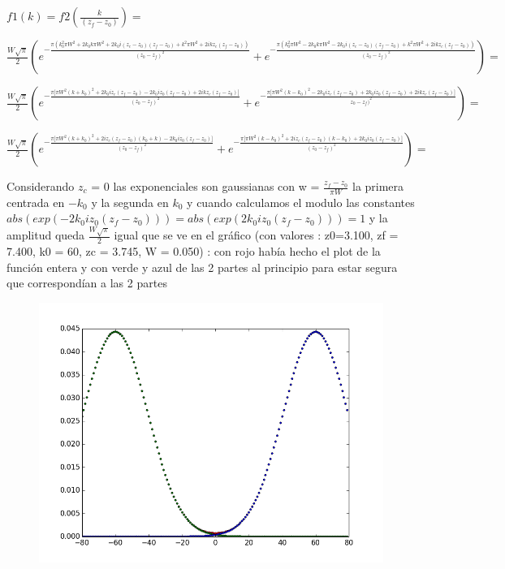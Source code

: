 \documentclass{article}
\begin{document}
$f1(k) = f2(\frac{k}{(z_f - z_0)}) = $

$ \frac{W \sqrt{\pi}}{2}  (e^{-\frac{\pi (k_0^2 \pi  W^2 + 2 k_0 k \pi W^2 + 2 k_0 i  (z_c - z_0) (z_f-z_0)+k^2 \pi W^2 +
2 i k z_c (z_f - z_0))}{(z_0-z_f)^2}}+e^{-\frac{\pi  (k_0^2 \pi  W^2 - 2 k_0 k \pi  W^2 - 2 k_0 i (z_c - z_0) (z_f-z_0)+k^2 \pi  W^2+2 i k z_c (z_f - z_0))}{(z_0-z_f)^2}}) =
$

$ \frac{W \sqrt{\pi}}{2}  (e^{-\frac{\pi \big[ \pi  W^2 (k + k_0)^2   + 2 k_0 i z_c(z_f - z_0)   - 2 k_0 i z_0 (z_f-z_0) +
2 i k z_c (z_f - z_0)\big]}{(z_0-z_f)^2}}+e^{-\frac{\pi \big[\pi  W^2 (k - k_0)^2  -2 k_0 i z_c(z_f - z_0)  + 2 k_0 i z_0 (z_f-z_0)+2 i k z_c (z_f - z_0)\big]}{z_0-z_f)^2}}) =
$

$ \frac{W \sqrt{\pi}}{2}  (e^{-\frac{\pi \big[ \pi  W^2 (k + k_0)^2   + 2  i z_c(z_f - z_0)(k_0 + k)   - 2 k_0 i z_0 (z_f-z_0) \big]}{(z_0-z_f)^2}}+e^{-\frac{\pi \big[\pi  W^2 (k - k_0)^2  +2 i z_c(z_f - z_0)(k - k_0)  + 2 k_0 i z_0 (z_f-z_0)\big]}{(z_0-z_f)^2}}) =
$

Considerando $z_c$ = 0 
las exponenciales son  gaussianas  con w = $\frac{z_f - z_0}{\pi W}$ la primera centrada en $-k_0$ y la segunda en $k_0$
y cuando calculamos el modulo las constantes $ abs(exp( - 2 k_0 i z_0 (z_f-z_0))) = abs(exp( 2 k_0 i z_0 (z_f-z_0)))  = 1$
y la amplitud queda $\frac{W \sqrt{\pi}}{2}$ igual que se ve en el gráfico (con valores :  z0=3.100, zf = 7.400, k0 = 60, zc = 3.745, W = 0.050) : con rojo había hecho el plot de la función entera y con verde y azul de las 2 partes al principio para estar segura que correspondían a las 2 partes

\begin{figure}[!ht] 
 \centering 
 \includegraphics[scale=0.5]{gauss.png} 
\end{figure} 
 
\end{document}
